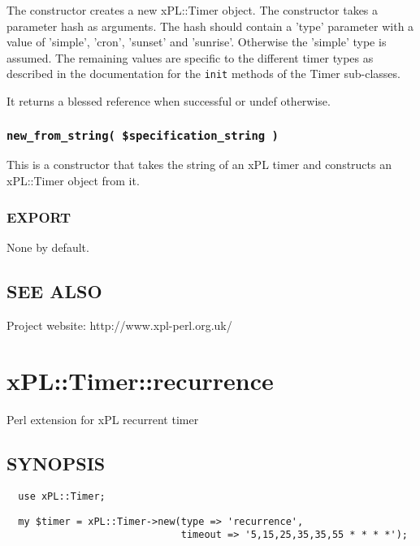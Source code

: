 \documentclass[12pt,a4paper]{article}
\begin{document}
The constructor creates a new xPL::Timer object.  The constructor
takes a parameter hash as arguments.  The hash should contain a 'type'
parameter with a value of 'simple', 'cron', 'sunset' and 'sunrise'.
Otherwise the 'simple' type is assumed.  The remaining values are
specific to the different timer types as described in the
documentation for the \texttt{init} methods of the Timer sub-classes.



It returns a blessed reference when successful or undef otherwise.

\subsubsection*{\texttt{new\_from\_string( \$specification\_string )}\label{xPL::Timer_new_from_string_specification_string_}}


This is a constructor that takes the string of an xPL timer and
constructs an xPL::Timer object from it.

\subsubsection*{EXPORT\label{xPL::Timer_EXPORT}}


None by default.

\subsection*{SEE ALSO\label{xPL::Timer_SEE_ALSO}}


Project website: http://www.xpl-perl.org.uk/

\newpage
\section{xPL::Timer::recurrence\label{xPL::Timer::recurrence}}


Perl extension for xPL recurrent timer

\subsection*{SYNOPSIS\label{xPL::Timer::recurrence_SYNOPSIS}}
\begin{verbatim}
  use xPL::Timer;
\end{verbatim}
\begin{verbatim}
  my $timer = xPL::Timer->new(type => 'recurrence',
                              timeout => '5,15,25,35,35,55 * * * *');
\end{verbatim}
\end{document}
